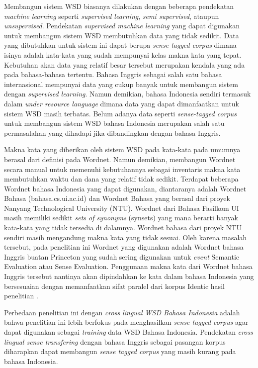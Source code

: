 Membangun sistem WSD biasanya dilakukan dengan beberapa pendekatan \textit{machine learning} seperti \textit{supervised learning}, \textit{semi supervised}, ataupun \textit{unsupervised}. Pendekatan \textit{supervised machine learning} yang dapat digunakan untuk membangun sistem WSD membutuhkan data yang tidak sedikit. Data yang dibutuhkan untuk sistem ini dapat berupa \textit{sense-tagged corpus} dimana isinya adalah kata-kata yang sudah mempunyai kelas makna kata yang tepat. Kebutuhan akan data yang relatif besar tersebut merupakan kendala yang ada pada bahasa-bahasa tertentu. Bahasa Inggris sebagai salah satu bahasa internasional mempunyai data yang cukup banyak untuk membangun sistem dengan \textit{supervised learning}. Namun demikian, bahasa Indonesia sendiri termasuk dalam \textit{under resource language} dimana data yang dapat dimanfaatkan untuk sistem WSD masih terbatas. Belum adanya data seperti \textit{sense-tagged corpus} untuk membangun sistem WSD bahasa Indonesia merupakan salah satu permasalahan yang dihadapi jika dibandingkan dengan bahasa Inggris.

Makna kata yang diberikan oleh sistem WSD pada kata-kata pada umumnya berasal dari definisi pada Wordnet. Namun demikian, membangun Wordnet secara manual untuk memenuhi kebutuhannya sebagai inventaris makna kata membutuhkan waktu dan dana yang relatif tidak sedikit. Terdapat beberapa Wordnet bahasa Indonesia yang dapat digunakan, diantaranya adalah Wordnet Bahasa (bahasa.cs.ui.ac.id) dan Wordnet Bahasa yang berasal dari proyek Nanyang Technological University (NTU).  Wordnet dari Bahasa Fasilkom UI masih memiliki sedikit \textit{sets of synonyms} (synsets) yang mana berarti banyak kata-kata yang tidak tersedia di dalamnya. Wordnet bahasa dari proyek NTU sendiri masih mengandung makna kata yang tidak sesuai. Oleh karena masalah tersebut, pada penelitian ini Wordnet yang digunakan adalah Wordnet bahasa Inggris buatan Princeton yang sudah sering digunakan untuk \textit{event} Semantic Evaluation atau Sense Evaluation. Penggunaan makna kata dari Wordnet bahasa Inggris tersebut nantinya akan dipindahkan ke kata dalam bahasa Indonesia yang bersesuaian dengan memanfaatkan sifat paralel dari korpus Identic hasil penelitian \citep{larasati2012identic}.

Perbedaan penelitian ini dengan \textit{cross lingual WSD Bahasa Indonesia} \citep{septiantri2013wsd} adalah bahwa penelitian ini lebih berfokus pada menghasilkan \textit{sense tagged corpus} agar dapat digunakan sebagai \textit{training} data WSD Bahasa Indonesia. Pendekatan \textit{cross lingual sense transfering} dengan bahasa Inggris sebagai pasangan korpus diharapkan dapat membangun \textit{sense tagged corpus} yang masih kurang pada bahasa Indonesia. 
